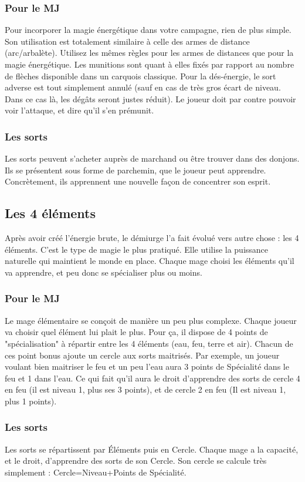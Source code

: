 \subsubsection{Pour le MJ}
Pour incorporer la magie énergétique dans votre campagne, rien de plus simple. Son utilisation est totalement similaire à celle des armes de distance (arc/arbalète). Utilisez les mêmes règles pour les armes de distances que pour la magie énergétique. Les munitions sont quant à elles fixés par rapport au nombre de flèches disponible dans un carquois classique. 
\newline
Pour la dés-énergie, le sort adverse est tout simplement annulé (sauf en cas de très gros écart de niveau. Dans ce cas là, les dégâts seront justes réduit). Le joueur doit par contre pouvoir voir l'attaque, et dire qu'il s'en prémunit.
\subsubsection{Les sorts}
Les sorts peuvent s'acheter auprès de marchand ou être trouver dans des donjons. Ils se présentent sous forme de parchemin, que le joueur peut apprendre. Concrètement, ils apprennent une nouvelle façon de concentrer son esprit.

\subsection{Les 4 éléments}
Après avoir créé l'énergie brute, le démiurge l'a fait évolué vers autre chose : les 4 éléments. C'est le type de magie le plus pratiqué. Elle utilise la puissance naturelle qui maintient le monde en place. Chaque mage choisi les éléments qu'il va apprendre, et peu donc se spécialiser plus ou moins.
\subsubsection{Pour le MJ}
Le mage élémentaire se conçoit de manière un peu plus complexe. Chaque joueur va choisir quel élément lui plait le plus. Pour ça, il dispose de 4 points de "spécialisation" à répartir entre les 4 éléments (eau, feu, terre et air). Chacun de ces point bonus ajoute un cercle aux sorts maitrisés. 
Par exemple, un joueur voulant bien maitriser le feu et un peu l'eau aura 3 points de Spécialité dans le feu et 1 dans l'eau. Ce qui fait qu'il aura le droit d'apprendre des sorts de cercle 4 en feu (il est niveau 1, plus ses 3 points), et de cercle 2 en feu (Il est niveau 1, plus 1 points).
\subsubsection{Les sorts}
Les sorts se répartissent par Éléments puis en Cercle. Chaque mage a la capacité, et le droit, d'apprendre des sorts de son Cercle. Son cercle se calcule très simplement : Cercle=Niveau+Points de Spécialité.

